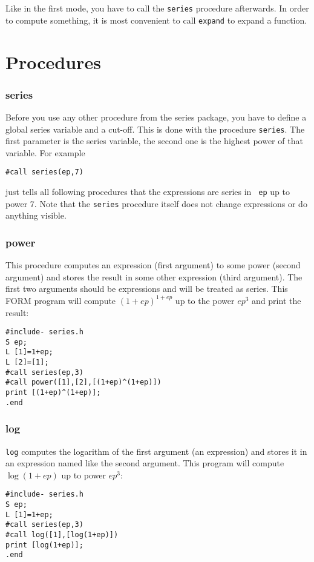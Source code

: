 \documentclass{article}
\begin{document}
Like in the first mode, you have to call the {\tt series} procedure
afterwards. In order to compute something, it is most convenient to call {\tt expand} to expand a
function.



\section{Procedures}
\label{sec:proc}


\subsubsection{series}
\label{sec:series}

Before you use any other procedure from the series package, you have to define a global
series variable and a cut-off. This is done with the
procedure {\tt series}. The first parameter is the series variable, the
second one is the highest power of that variable. For example
\begin{verbatim}
#call series(ep,7)
\end{verbatim}
just tells all following procedures that the expressions are series in {\tt
  ep} up to power 7. Note that the {\tt series} procedure itself does
not change expressions or do anything visible.

\subsubsection{power}
\label{sec:pow}

This procedure computes an expression (first argument) to some power
(second argument) and stores the result in some other expression (third
argument). The first two arguments should be expressions and will be
treated as series. This FORM program will compute $(1+ep)^{1+ep}$ up to
the power $ep^3$ and print the result:
\begin{verbatim}
#include- series.h
S ep;
L [1]=1+ep;
L [2]=[1];
#call series(ep,3)
#call power([1],[2],[(1+ep)^(1+ep)])
print [(1+ep)^(1+ep)];
.end
\end{verbatim}


\subsubsection{log}
\label{sec:log}

{\tt log} computes the logarithm of the first argument (an
expression) and stores it in an expression named like the second
argument. This program will compute $\log (1+ep)$ up to power $ep^3$:
\begin{verbatim}
#include- series.h
S ep;
L [1]=1+ep;
#call series(ep,3)
#call log([1],[log(1+ep)])
print [log(1+ep)];
.end
\end{verbatim}
\end{document}
